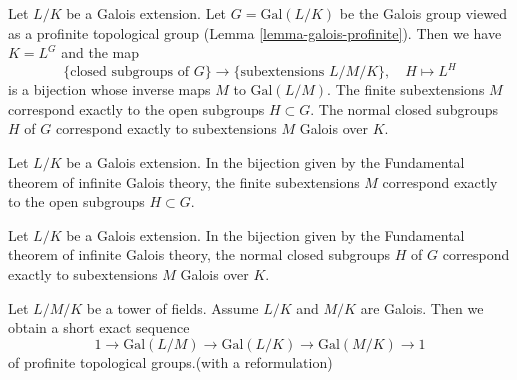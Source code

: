 \begin{theorem}\cite[\href{https://stacks.math.columbia.edu/tag/0BML}{Theorem 0BML}]{stacks-project}
	\label{theorem-inifinite-galois-fundamental-theorem}
	\leanok
	Let $L/K$ be a Galois extension. Let $G = \text{Gal}(L/K)$
	be the Galois group viewed as a profinite topological group
	(Lemma \ref{lemma-galois-profinite}). Then we have $K = L^G$ and the map
	$$
	\{\text{closed subgroups of }G\}
	\longrightarrow
	\{\text{subextensions }L/M/K\},\quad
	H \longmapsto L^H
	$$
	is a bijection whose inverse maps $M$ to $\text{Gal}(L/M)$.
	The finite subextensions $M$ correspond exactly to the open
	subgroups $H \subset G$. The normal closed subgroups $H$ of $G$
	correspond exactly to subextensions $M$ Galois over $K$.
\end{theorem}

\begin{theorem} \cite[\href{https://stacks.math.columbia.edu/tag/0BML}{Theorem 0BML}]{stacks-project}
	\label{theorem-inifinite-galois-fundamental-theorem-special-case1}
	\leanok
	Let $L/K$ be a Galois extension. In the bijection given by the Fundamental theorem of infinite Galois theory,
	the finite subextensions $M$ correspond exactly to the open subgroups $H \subset G$.
\end{theorem}

\begin{theorem} \cite[\href{https://stacks.math.columbia.edu/tag/0BML}{Theorem 0BML}]{stacks-project}
	\label{theorem-inifinite-galois-fundamental-theorem-special-case2}
	\leanok
	Let $L/K$ be a Galois extension. In the bijection given by the Fundamental theorem of infinite Galois theory,
	the normal closed subgroups $H$ of $G$ correspond exactly to subextensions $M$ Galois over $K$.
\end{theorem}

\begin{lemma}\cite[\href{https://stacks.math.columbia.edu/tag/0BMM}{Lemma 0BMM}]{stacks-project}
	\label{lemma-ses-infinite-galois}
	\leanok
	Let $L/M/K$ be a tower of fields. Assume $L/K$ and $M/K$ are Galois.
	Then we obtain a short exact sequence
	$$
	1 \to \text{Gal}(L/M) \to \text{Gal}(L/K) \to \text{Gal}(M/K) \to 1
	$$
	of profinite topological groups.(with a reformulation)
\end{lemma}